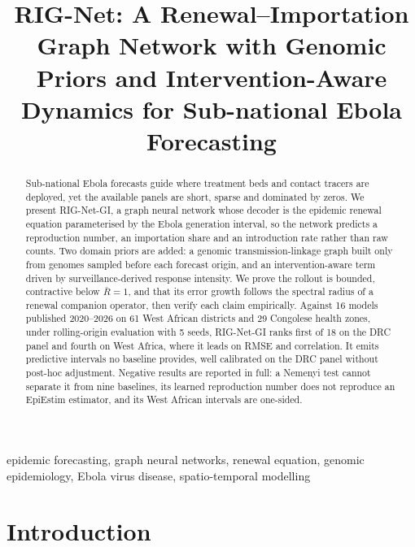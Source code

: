 \documentclass[conference]{IEEEtran}
\begin{document}
\title{RIG-Net: A Renewal--Importation Graph Network with Genomic Priors and Intervention-Aware Dynamics for Sub-national Ebola Forecasting}

\author{
}

\maketitle

\begin{abstract}
Sub-national Ebola forecasts guide where treatment beds and contact tracers are deployed, yet the available panels are short, sparse and dominated by zeros. We present RIG-Net-GI, a graph neural network whose decoder is the epidemic renewal equation parameterised by the Ebola generation interval, so the network predicts a reproduction number, an importation share and an introduction rate rather than raw counts. Two domain priors are added: a genomic transmission-linkage graph built only from genomes sampled before each forecast origin, and an intervention-aware term driven by surveillance-derived response intensity. We prove the rollout is bounded, contractive below $\bar R=1$, and that its error growth follows the spectral radius of a renewal companion operator, then verify each claim empirically. Against 16 models published 2020--2026 on 61 West African districts and 29 Congolese health zones, under rolling-origin evaluation with 5 seeds, RIG-Net-GI ranks first of 18 on the DRC panel and fourth on West Africa, where it leads on RMSE and correlation. It emits predictive intervals no baseline provides, well calibrated on the DRC panel without post-hoc adjustment. Negative results are reported in full: a Nemenyi test cannot separate it from nine baselines, its learned reproduction number does not reproduce an EpiEstim estimator, and its West African intervals are one-sided.
\end{abstract}

\begin{IEEEkeywords}
epidemic forecasting, graph neural networks, renewal equation, genomic epidemiology, Ebola virus disease, spatio-temporal modelling
\end{IEEEkeywords}

\section{Introduction}
\end{document}
